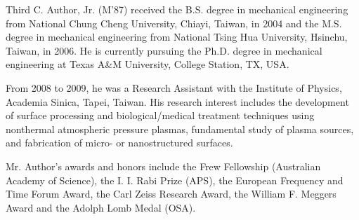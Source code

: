 \documentclass{ieeeaccess}
\begin{document}
	\begin{IEEEbiographynophoto}{Third C. Author, Jr.} (M'87) received the B.S. degree in mechanical
		engineering from National Chung Cheng University, Chiayi, Taiwan, in 2004
		and the M.S. degree in mechanical engineering from National Tsing Hua
		University, Hsinchu, Taiwan, in 2006. He is currently pursuing the Ph.D.
		degree in mechanical engineering at Texas A{\&}M University, College
		Station, TX, USA.
		
		From 2008 to 2009, he was a Research Assistant with the Institute of
		Physics, Academia Sinica, Tapei, Taiwan. His research interest includes the
		development of surface processing and biological/medical treatment
		techniques using nonthermal atmospheric pressure plasmas, fundamental study
		of plasma sources, and fabrication of micro- or nanostructured surfaces.
		
		Mr. Author's awards and honors include the Frew Fellowship (Australian
		Academy of Science), the I. I. Rabi Prize (APS), the European Frequency and
		Time Forum Award, the Carl Zeiss Research Award, the William F. Meggers
		Award and the Adolph Lomb Medal (OSA).
	\end{IEEEbiographynophoto}
	
	\EOD
	
\end{document}
